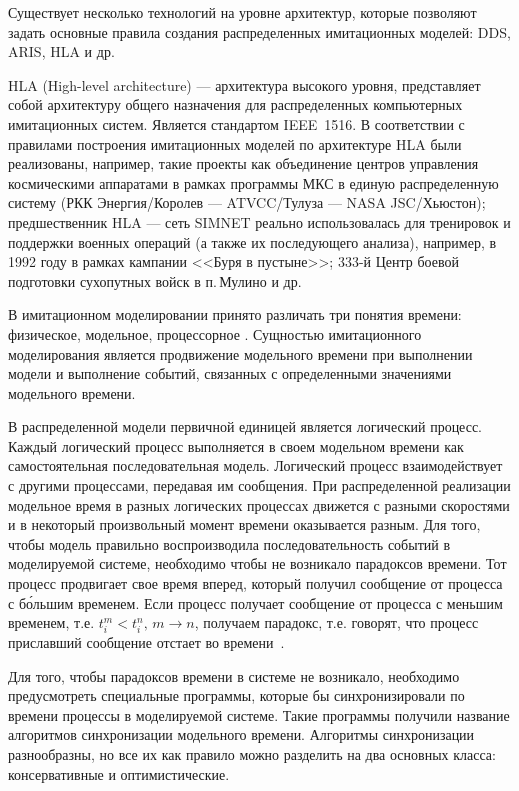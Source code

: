 Существует несколько технологий на уровне архитектур, которые позволяют задать основные правила создания распределенных имитационных моделей: DDS, ARIS, HLA и др.

HLA (High-level architecture) --- архитектура высокого уровня, представляет собой архитектуру общего назначения для распределенных компьютерных имитационных систем. Является стандартом IEEE~1516.
В соответствии с правилами построения имитационных моделей по архитектуре HLA были реализованы, например, такие проекты как объединение центров управления космическими аппаратами в рамках программы МКС в единую распределенную систему (РКК Энергия/Королев --- ATVCC/Тулуза --- NASA JSC/Хьюстон); предшественник HLA --- сеть SIMNET реально использовалась для тренировок и поддержки военных операций (а также их последующего анализа), например, в 1992 году в рамках кампании <<Буря в пустыне>>; 333-й Центр боевой подготовки сухопутных войск в п.\,Мулино и др.

В имитационном моделировании принято различать три понятия времени: физическое, модельное, процессорное \cite{okol}. Сущностью имитационного моделирования является продвижение модельного времени при выполнении модели и выполнение событий, связанных с определенными значениями модельного времени.

В распределенной модели первичной единицей является логический процесс. Каждый логический процесс выполняется в своем модельном времени как самостоятельная последовательная модель. Логический процесс взаимодействует с другими процессами, передавая им сообщения. При распределенной реализации модельное время в разных логических процессах движется с разными скоростями и в некоторый произвольный момент времени оказывается разным. Для того, чтобы модель правильно воспроизводила последовательность событий в моделируемой системе, необходимо чтобы не возникало парадоксов времени. Тот процесс продвигает свое время вперед, который получил сообщение от процесса с б\'ольшим временем. Если процесс получает сообщение от процесса с меньшим временем, т.е. $t_i^m<t_i^n, \, m \to n$, получаем парадокс, т.е. говорят, что процесс приславший сообщение  отстает во времени~\cite{okol}.

Для того, чтобы парадоксов времени в системе не возникало, необходимо предусмотреть специальные программы, которые бы синхронизировали по времени процессы в моделируемой системе. Такие программы получили название алгоритмов синхронизации модельного времени. Алгоритмы синхронизации разнообразны, но все их как правило можно разделить на два основных класса: консервативные и оптимистические.


